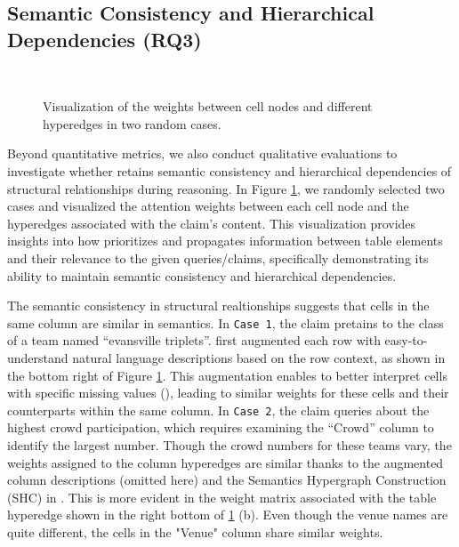 {\subsection{Semantic Consistency and Hierarchical Dependencies (RQ3)}
\begin{figure}[t!]
    \centering
  \begin{minipage}[t]{\linewidth} %
  \end{minipage}\\
  \begin{minipage}[t]{\linewidth} %
  \end{minipage}
\vspace{-0.1in}
\caption{Visualization of the weights between cell nodes and different hyperedges in two random cases.}
\label{fig:case_study}
\end{figure}
Beyond quantitative metrics, we also conduct qualitative evaluations to investigate whether \name retains semantic consistency and hierarchical dependencies of structural relationships during reasoning. In Figure \ref{fig:case_study}, we randomly selected two cases and visualized the attention weights between each cell node and the hyperedges associated with the claim's content. This visualization provides insights into how \name prioritizes and propagates information between table elements and their relevance to the given queries/claims, specifically demonstrating its ability to maintain semantic consistency and hierarchical dependencies.

The semantic consistency in structural realtionships suggests that cells in the same column are similar in semantics. In \texttt{Case 1}, the claim pretains to the class of a team named ``evansville triplets''. \name first augmented each row with easy-to-understand natural language descriptions based on the row context, as shown in the bottom right of Figure \ref{fig:case_study}. This augmentation enables \name to better interpret cells with specific missing values (), leading to similar weights for these cells and their counterparts within the same column. In \texttt{Case 2}, the claim queries about the highest crowd participation, which requires examining the ``Crowd'' column to identify the largest number. Though the crowd numbers for these teams vary, the weights assigned to the column hyperedges are similar thanks to the augmented column descriptions (omitted here) and the Semantics Hypergraph Construction (SHC) in \name. This is more evident in the weight matrix associated with the table hyperedge shown in the right bottom of \ref{fig:case_study} (b). Even though the venue names are quite different, the cells in the "Venue" column share similar weights.

}
